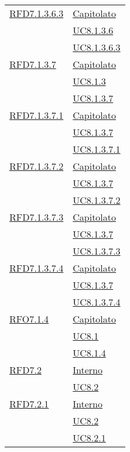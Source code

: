 \begin{longtable}{|>{\centering}m{5cm}|m{5cm}<{\centering}|}
\hyperlink{RFD7.1.3.6.3}{RFD7.1.3.6.3} & \hyperlink{Capitolato}{Capitolato}\\
& \hyperref[UC8.1.3.6]{UC8.1.3.6}\\
& \hyperref[UC8.1.3.6.3]{UC8.1.3.6.3}\\ \hline

\hyperlink{RFD7.1.3.7}{RFD7.1.3.7} & \hyperlink{Capitolato}{Capitolato}\\
& \hyperref[UC8.1.3]{UC8.1.3}\\
& \hyperref[UC8.1.3.7]{UC8.1.3.7}\\ \hline

\hyperlink{RFD7.1.3.7.1}{RFD7.1.3.7.1} & \hyperlink{Capitolato}{Capitolato}\\
& \hyperref[UC8.1.3.7]{UC8.1.3.7}\\
& \hyperref[UC8.1.3.7.1]{UC8.1.3.7.1}\\ \hline

\hyperlink{RFD7.1.3.7.2}{RFD7.1.3.7.2} & \hyperlink{Capitolato}{Capitolato}\\
& \hyperref[UC8.1.3.7]{UC8.1.3.7}\\
& \hyperref[UC8.1.3.7.2]{UC8.1.3.7.2}\\ \hline

\hyperlink{RFD7.1.3.7.3}{RFD7.1.3.7.3} & \hyperlink{Capitolato}{Capitolato}\\
& \hyperref[UC8.1.3.7]{UC8.1.3.7}\\
& \hyperref[UC8.1.3.7.3]{UC8.1.3.7.3}\\ \hline

\hyperlink{RFD7.1.3.7.4}{RFD7.1.3.7.4} & \hyperlink{Capitolato}{Capitolato}\\
& \hyperref[UC8.1.3.7]{UC8.1.3.7}\\
& \hyperref[UC8.1.3.7.4]{UC8.1.3.7.4}\\ \hline

\hyperlink{RFO7.1.4}{RFO7.1.4} & \hyperlink{Capitolato}{Capitolato}\\
& \hyperref[UC8.1]{UC8.1}\\
& \hyperref[UC8.1.4]{UC8.1.4}\\ \hline

\hyperlink{RFD7.2}{RFD7.2} & \hyperlink{Interno}{Interno}\\
& \hyperref[UC8.2]{UC8.2}\\ \hline

\hyperlink{RFD7.2.1}{RFD7.2.1} & \hyperlink{Interno}{Interno}\\
& \hyperref[UC8.2]{UC8.2}\\
& \hyperref[UC8.2.1]{UC8.2.1}\\ \hline


\end{longtable}
